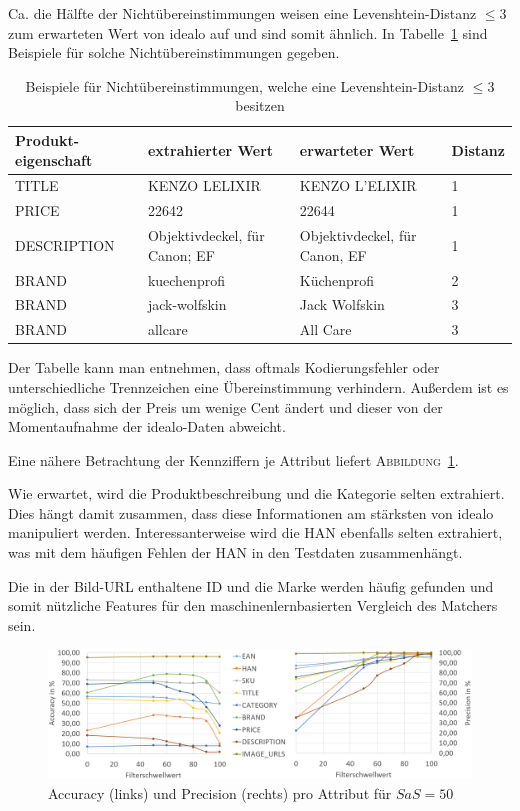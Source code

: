 Ca. die Hälfte der Nichtübereinstimmungen weisen eine Levenshtein-Distanz $\leq 3$ zum erwarteten Wert von idealo
auf und sind somit ähnlich.
In Tabelle~\ref{tab:levenshtein-examples} sind Beispiele für solche Nichtübereinstimmungen gegeben.

\begin{table}[h]
    \centering
    \begin{tabular}{ p{2.5cm} | p{5cm} | p{5cm} | p{1cm}}
        \textbf{Produkt-eigenschaft} & \textbf{extrahierter Wert} & \textbf{erwarteter Wert} &
        \textbf{Distanz} \\
        \hline
        TITLE & KENZO LELIXIR & KENZO L'ELIXIR & 1\\
        PRICE & 22642 & 22644 & 1\\
        DESCRIPTION & Objektivdeckel, für Canon; EF	& Objektivdeckel, für Canon, EF & 1\\
        BRAND &	kuechenprofi & Küchenprofi & 2\\
        BRAND & jack-wolfskin & Jack Wolfskin & 3\\
        BRAND & allcare & All Care & 3
    \end{tabular}
    \caption{Beispiele für Nichtübereinstimmungen, welche eine Levenshtein-Distanz $\leq 3$ besitzen}
    \label{tab:levenshtein-examples}
\end{table}

Der Tabelle kann man entnehmen, dass oftmals Kodierungsfehler oder unterschiedliche Trennzeichen eine
Übereinstimmung verhindern.
Außerdem ist es möglich, dass sich der Preis um wenige Cent ändert und dieser von der Momentaufnahme der
idealo-Daten abweicht.

Eine nähere Betrachtung der Kennziffern je Attribut liefert \textsc{Abbildung}~\ref{abb:testdaten}.

Wie erwartet, wird die Produktbeschreibung und die Kategorie selten extrahiert.
Dies hängt damit zusammen, dass diese Informationen am stärksten von idealo manipuliert werden.
Interessanterweise wird die HAN ebenfalls selten extrahiert, was mit dem häufigen Fehlen der HAN in den
Testdaten zusammenhängt.

Die in der Bild-URL enthaltene ID und die Marke werden häufig gefunden und somit nützliche Features
für den maschinenlernbasierten Vergleich des Matchers sein.

\begin{figure}[H]
    \centering
    \includegraphics[width=\textwidth]{resources/accuracy-and-precision-per-attribute.PNG}
    \caption{Accuracy (links) und Precision (rechts) pro Attribut für $SaS=50$}
    \label{abb:testdaten}
\end{figure}

